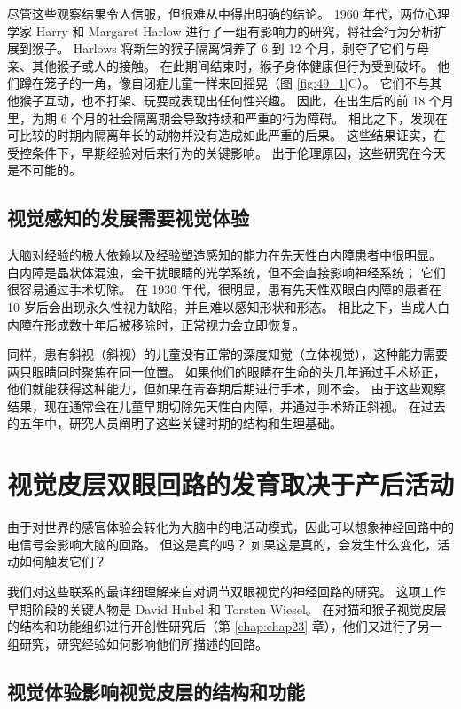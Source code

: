 尽管这些观察结果令人信服，但很难从中得出明确的结论。
1960 年代，两位心理学家 Harry 和 Margaret Harlow 进行了一组有影响力的研究，将社会行为分析扩展到猴子。
Harlows 将新生的猴子隔离饲养了 6 到 12 个月，剥夺了它们与母亲、其他猴子或人的接触。
在此期间结束时，猴子身体健康但行为受到破坏。 他们蹲在笼子的一角，像自闭症儿童一样来回摇晃（图 \ref{fig:49_1}C）。
它们不与其他猴子互动，也不打架、玩耍或表现出任何性兴趣。
因此，在出生后的前 18 个月里，为期 6 个月的社会隔离期会导致持续和严重的行为障碍。
相比之下，发现在可比较的时期内隔离年长的动物并没有造成如此严重的后果。
这些结果证实，在受控条件下，早期经验对后来行为的关键影响。
出于伦理原因，这些研究在今天是不可能的。


\subsection{视觉感知的发展需要视觉体验}

大脑对经验的极大依赖以及经验塑造感知的能力在先天性白内障患者中很明显。
白内障是晶状体混浊，会干扰眼睛的光学系统，但不会直接影响神经系统；
它们很容易通过手术切除。
在 1930 年代，很明显，患有先天性双眼白内障的患者在 10 岁后会出现永久性视力缺陷，并且难以感知形状和形态。
相比之下，当成人白内障在形成数十年后被移除时，正常视力会立即恢复。


同样，患有斜视（斜视）的儿童没有正常的深度知觉（立体视觉），这种能力需要两只眼睛同时聚焦在同一位置。
如果他们的眼睛在生命的头几年通过手术矫正，他们就能获得这种能力，但如果在青春期后期进行手术，则不会。
由于这些观察结果，现在通常会在儿童早期切除先天性白内障，并通过手术矫正斜视。
在过去的五年中，研究人员阐明了这些关键时期的结构和生理基础。


\section{视觉皮层双眼回路的发育取决于产后活动}

由于对世界的感官体验会转化为大脑中的电活动模式，因此可以想象神经回路中的电信号会影响大脑的回路。
但这是真的吗？
如果这是真的，会发生什么变化，活动如何触发它们？


我们对这些联系的最详细理解来自对调节双眼视觉的神经回路的研究。
这项工作早期阶段的关键人物是 David Hubel 和 Torsten Wiesel。
在对猫和猴子视觉皮层的结构和功能组织进行开创性研究后（第 \ref{chap:chap23} 章），他们又进行了另一组研究，研究经验如何影响他们所描述的回路。



\subsection{视觉体验影响视觉皮层的结构和功能}

